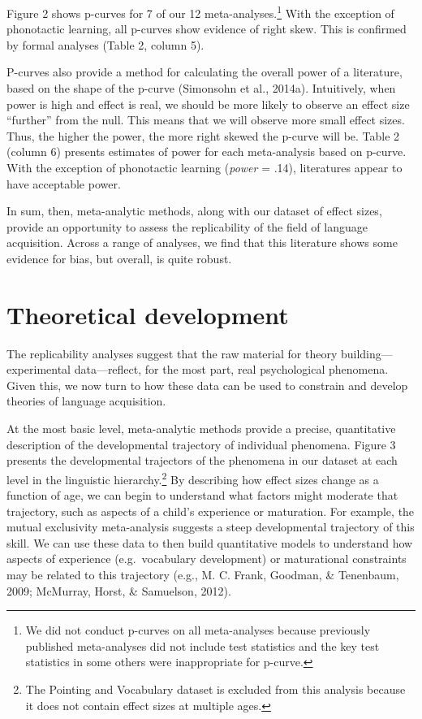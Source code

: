 \documentclass[english,floatsintext,man]{apa6}
\begin{document}
Figure 2 shows p-curves for 7 of our 12
meta-analyses.\footnote{We did not conduct p-curves on all meta-analyses because previously published meta-analyses did not include test statistics and the key test statistics in some others were inappropriate for p-curve. }
With the exception of phonotactic learning, all p-curves show evidence
of right skew. This is confirmed by formal analyses (Table 2, column 5).

P-curves also provide a method for calculating the overall power of a
literature, based on the shape of the p-curve (Simonsohn et al., 2014a).
Intuitively, when power is high and effect is real, we should be more
likely to observe an effect size \enquote{further} from the null. This
means that we will observe more small effect sizes. Thus, the higher the
power, the more right skewed the p-curve will be. Table 2 (column 6)
presents estimates of power for each meta-analysis based on p-curve.
With the exception of phonotactic learning (\emph{power} = .14),
literatures appear to have acceptable power.

In sum, then, meta-analytic methods, along with our dataset of effect
sizes, provide an opportunity to assess the replicability of the field
of language acquisition. Across a range of analyses, we find that this
literature shows some evidence for bias, but overall, is quite robust.

\section{Theoretical development}\label{theoretical-development}

The replicability analyses suggest that the raw material for theory
building---experimental data---reflect, for the most part, real
psychological phenomena. Given this, we now turn to how these data can
be used to constrain and develop theories of language acquisition.

At the most basic level, meta-analytic methods provide a precise,
quantitative description of the developmental trajectory of individual
phenomena. Figure 3 presents the developmental trajectors of the
phenomena in our dataset at each level in the linguistic
hierarchy.\footnote{The Pointing and Vocabulary dataset is excluded from this analysis because it does not contain effect sizes at multiple ages.}
By describing how effect sizes change as a function of age, we can begin
to understand what factors might moderate that trajectory, such as
aspects of a child's experience or maturation. For example, the mutual
exclusivity meta-analysis suggests a steep developmental trajectory of
this skill. We can use these data to then build quantitative models to
understand how aspects of experience (e.g.~vocabulary development) or
maturational constraints may be related to this trajectory (e.g., M. C.
Frank, Goodman, \& Tenenbaum, 2009; McMurray, Horst, \& Samuelson,
2012).
\end{document}
